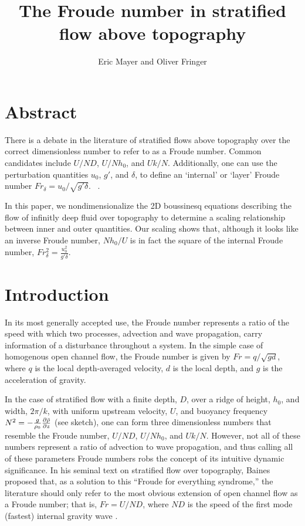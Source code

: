 \documentclass[12pt]{article}
\begin{document}
	
	\title{The Froude number in stratified flow above topography}
	
	\author{Eric Mayer and Oliver Fringer}
	
	\maketitle
	
	\section{Abstract}
	
	There is a debate in the literature of stratified flows above topography over the correct dimensionless number to refer to as a Froude number. Common candidates include $U/ND$, $U/Nh_0$, and $Uk/N$. 
	Additionally, one can use the perturbation quantities $u_0$, $g'$, and $\delta$, to define an `internal' or `layer' Froude number $Fr_{\delta}=u_0/\sqrt{g'\delta}$. ~\citep{Rossby1951,Winters2012}. 
	
	In this paper, we nondimensionalize the 2D boussinesq equations describing the flow of infinitly deep fluid over topography to determine a scaling relationship between inner and outer quantities. Our scaling shows that, although it looks like an inverse Froude number, $Nh_0/U$ is in fact the square of the internal Froude number, $Fr_{\delta}^2=\frac{u_0^2}{g'\delta}$. 
	
	
	
	\section{Introduction}
	
	In its most generally accepted use, the Froude number represents a ratio of the speed with which two processes,  advection and wave propagation, carry information of a disturbance throughout a system. In the simple case of homogenous open channel flow, the Froude number is given by $Fr=q/\sqrt{gd}$, where $q$ is the  local depth-averaged velocity, $d$ is the local depth, and $g$ is the acceleration of gravity. 
	
	In the case of stratified flow with a finite depth, $D$, over a ridge of height, $h_0$, and width, $2\pi/k$, with uniform upstream velocity, $U$, and buoyancy frequency $N^2=-\frac{g}{\rho_0}\frac{\partial{\bar{\rho}}}{\partial{z}}$ (see sketch), one can form three dimensionless numbers that resemble the Froude number, $U/ND$, $U/Nh_0$, and $Uk/N$. However, not all of these numbers represent a ratio of advection to wave propagation, and thus calling all of these parameters Froude numbers robs the concept of its intuitive dynamic significance. In his seminal text on stratified flow over topography, Baines proposed that, as a solution to this ``Froude for everything syndrome,'' the literature should only refer to the most obvious extension of open channel flow as a Froude number; that is,  $Fr=U/ND$, where $ND$ is the speed of the first mode (fastest) internal gravity wave \citep{Baines1995}. 
	
\end{document}
